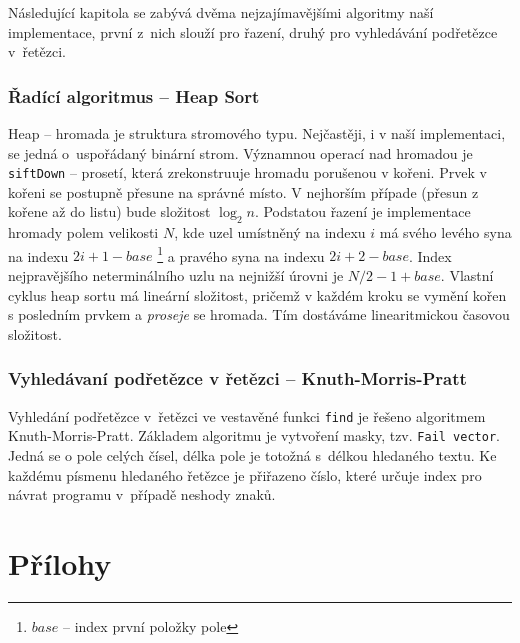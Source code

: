 \documentclass[a4paper, 12pt]{article}
\begin{document}
Následující kapitola se zabývá dvěma nejzajímavějšími algoritmy naší
implementace, první z~nich slouží pro řazení, druhý pro vyhledávání
podřetězce v~řetězci.

\subsubsection{Řadící algoritmus -- Heap Sort}

Heap -- hromada je struktura stromového typu. Nejčastěji, i v naší 
implementaci, se jedná o~uspořádaný binární strom. Významnou operací nad 
hromadou je \texttt{siftDown} -- prosetí, která zrekonstruuje hromadu 
porušenou v kořeni. Prvek v kořeni se postupně přesune na správné místo. V 
nejhorším případe (přesun z kořene až do listu) bude složitost $\log_2 n$. 
Podstatou řazení je implementace hromady polem velikosti $N$, kde uzel 
umístněný na indexu $i$ má svého levého syna na indexu $2i+1-base$ 
\footnote{$base$ -- index první položky pole} a pravého syna na indexu 
$2i+2-base$. Index nejpravějšího neterminálního uzlu na nejnižší úrovni je
$N/2-1+base$. Vlastní cyklus heap sortu má lineární složitost, pričemž v každém 
kroku se vymění kořen s posledním prvkem a \textit{proseje} se hromada. Tím 
dostáváme linearitmickou časovou složitost.

\subsubsection{Vyhledávaní podřetězce v řetězci -- Knuth-Morris-Pratt}
Vyhledání podřetězce v~řetězci ve vestavěné funkci \texttt{find} je řešeno
algoritmem Knuth-Morris-Pratt. Základem algoritmu je vytvoření masky, tzv.
\texttt{Fail vector}. Jedná se o pole celých čísel, délka pole je totožná
s~délkou hledaného textu. Ke každému písmenu hledaného řetězce je přiřazeno
číslo, které určuje index pro návrat programu v~případě neshody znaků.

\newpage
\section{Přílohy} \label{prilohy}

\renewcommand\thesubsection{\thesection.\Alph{subsection}}

\end{document}
